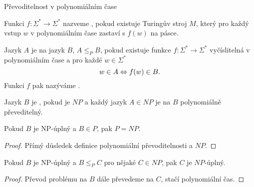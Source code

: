     
    
    
    
    \begin{frame}{Převoditelnost v polynomiálním čase}
    \begin{definition}
    Funkci $f: \Sigma^*\to \Sigma^*$ nazveme , pokud existuje Turingův stroj $M$, který pro každý vstup $w$ v polynomiálním čase zastaví s $f(w)$ na pásce.
    
    Jazyk $A$ je  na jazyk $B$, $A\leq_P B$, pokud existuje funkce $f: \Sigma^*\to \Sigma^*$ vyčíslitelná v polynomiálním čase a pro každé $w\in \Sigma^*$
    $$w\in A \Leftrightarrow f(w)\in B\hbox{.}
    $$
    Funkci $f$ pak nazýváme .
    \end{definition}
    
    \begin{definition}[$NP$ úplnost]
    Jazyk $B$ je , pokud je $NP$ a každý jazyk $A\in NP$ je na $B$ polynomiálně převeditelný.
    \end{definition}
    
    \end{frame}
    
    \begin{frame}{}
    \begin{theorem}
    Pokud $B$ je NP-úplný a $B\in P$, pak $P=NP$.
    \end{theorem}
    \begin{proof}
    Přímý důsledek definice polynomiální převoditelnosti a $NP$.
    \end{proof}
    \begin{theorem}
    Pokud $B$ je NP-úplný a $B\leq_P C$ pro nějaké $C\in NP$, pak $C$ je $NP$-úplný.
    \end{theorem}
    \begin{proof}
    Převod problému na $B$ dále převedeme na $C$, stačí polynomiální čas.
    \end{proof}
    
    
    \end{frame}
    
    
    
